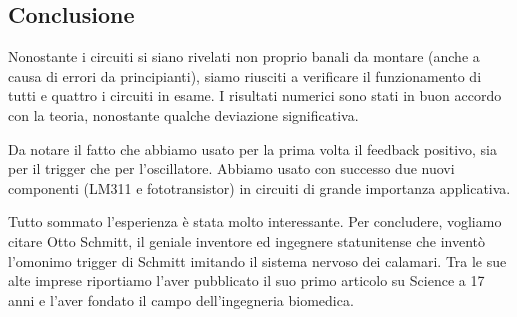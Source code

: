 \subsection{Conclusione}

Nonostante i circuiti si siano rivelati non proprio banali da montare (anche a causa di errori
da principianti), siamo riusciti a verificare il funzionamento di tutti e quattro i circuiti in esame.
I risultati numerici sono stati in buon accordo con la teoria, nonostante qualche deviazione significativa.

Da notare il fatto che abbiamo usato per la prima volta il feedback positivo, sia per il trigger che
per l'oscillatore. Abbiamo usato con successo due nuovi componenti (LM311 e fototransistor) in circuiti
di grande importanza applicativa.

Tutto sommato l'esperienza è stata molto interessante. Per concludere, vogliamo citare Otto Schmitt, il
geniale inventore ed ingegnere statunitense che inventò l'omonimo trigger di Schmitt imitando il sistema
nervoso dei calamari. Tra le sue alte imprese riportiamo l'aver pubblicato il suo primo articolo su Science
a 17 anni e l'aver fondato il campo dell'ingegneria biomedica.
